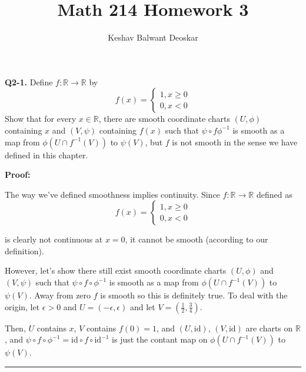 \documentclass{article}
\title{Math 214 Homework 3}
\author{Keshav Balwant Deoskar}
\newcommand{\R}{\mathbb{R}}
\begin{document}
\maketitle



\textbf{Q2-1.} Define $f : \R \rightarrow \R$ by
\[ f(x) = \begin{cases}
  1, x \geq 0\\
  0, x < 0
\end{cases} \]
Show that for every $x \in \R$, there are smooth coordinate charts $(U, \phi)$ containing $x$ and $(V, \psi)$ containing $f(x)$ such that $\psi \circ f \phi^{-1}$ is smooth as a map from $\phi(U \cap f^{-1}(V))$ to $\psi(V)$, but $f$ is not smooth in the sense we have defined in this chapter.

\vskip 0.5cm
\textbf{Proof:}

The way we've defined smoothness implies continuity. Since $f : \R \rightarrow \R$ defined as 
\[ f(x) = \begin{cases}
  1, x \geq 0 \\
  0, x < 0
\end{cases} \] 

is clearly not continuous at $x = 0$, it cannot be smooth (according to our definition).

\vskip 0.5cm
However, let's show there still exist smooth coordinate charts $(U, \phi)$ and $(V, \psi)$ such that $\psi \circ f \circ \phi^{-1}$ is smooth as a map from $\phi(U \cap f^{-1}(V))$ to $\psi(V)$. Away from zero $f$ is smooth so this is definitely true. To deal with the origin, let $\epsilon > 0$ and $U = (-\epsilon, \epsilon)$ and let $V = (\frac{1}{2}, \frac{3}{4})$. 

\vskip 0.5cm

Then, $U$ contains $x$, $V$ contains $f(0) = 1$, and $(U, \text{id})$, $(V, \text{id})$ are charts on $\R$, and $\psi \circ f \circ \phi^{-1} = \text{id} \circ f \circ \text{id}^{-1}$ is just the contant map on $\phi(U \cap f^{-1}(V))$ to $\psi(V)$.


\vskip 0.5cm
\hrule 
\vskip 0.5cm
\end{document}
